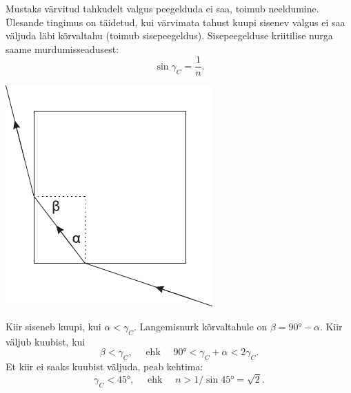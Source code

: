\documentclass[10pt]{article}
\begin{document}
{
\solu
Mustaks värvitud tahkudelt valgus peegelduda ei saa, toimub neeldumine. Ülesande tingimus on täidetud, kui värvimata tahust kuupi sisenev valgus ei saa
väljuda läbi kõrvaltahu (toimub sisepeegeldus). Sisepeegelduse kriitilise nurga saame murdumisseadusest:
\[
\sin \gamma_{C}=\frac{1}{n}.
\]

\begin{center}
	\includegraphics[width=0.45\linewidth]{2009-v2g-07-lah}
\end{center}

Kiir siseneb kuupi, kui $\alpha<\gamma_{C}$. Langemisnurk kõrvaltahule on $\beta = \ang{90} - \alpha$. Kiir väljub kuubist, kui
\[
\beta<\gamma_{C}, \quad \text { ehk } \quad \ang{90}<\gamma_{C}+\alpha<2 \gamma_{C}.
\]
Et kiir ei saaks kuubist väljuda, peab kehtima:
\[
\gamma_{C}<\ang{45}, \quad \text { ehk } \quad n>1 / \sin \ang{45}=\sqrt{2}.
\]
\probend
\bigskip


}
\end{document}
